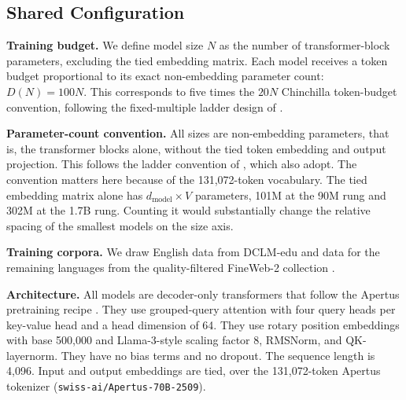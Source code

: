 \subsection{Shared Configuration}
\label{app:model-configurations}

\textbf{Training budget.}
We define model size $N$ as the number of transformer-block parameters, excluding the tied embedding matrix. Each model receives a token budget proportional to its exact non-embedding parameter count:
$D(N) = 100N.$
This corresponds to five times the $20N$ Chinchilla token-budget convention, %
following the fixed-multiple ladder design of 
\citet{magnusson_datadecide_2025}.

\textbf{Parameter-count convention.} All sizes are non-embedding parameters, that is, the transformer blocks alone, without the tied token embedding and output projection. This follows the ladder convention of \citet{bhagia_establishing_2025}, which \citet{heineman_signal_2025} also adopt. The convention matters here because of the 131,072-token vocabulary. The tied embedding matrix alone has $d_{\mathrm{model}} \times V$ parameters, 101M at the 90M rung and 302M at the 1.7B rung. Counting it would substantially change the relative spacing of the smallest models on the size axis.

\textbf{Training corpora.}
We draw English data from DCLM-edu \citep{li_datacomp-lm_2025} and data for the remaining languages from the quality-filtered FineWeb-2 collection \citep{penedo_fineweb2_2025,messmer_enhancing_2026}. %

\textbf{Architecture.} All models are decoder-only transformers that follow the Apertus pretraining recipe \citep{apertus_apertus_2025}. They use grouped-query attention \citep{ainslie_gqa_2023} with four query heads per key-value head and a head dimension of 64. They use rotary position embeddings \citep{su_roformer_2023} with base 500,000 and Llama-3-style scaling factor 8, RMSNorm, and QK-layernorm. They have no bias terms and no dropout. The sequence length is 4,096. Input and output embeddings are tied, over the 131,072-token Apertus tokenizer (\texttt{swiss-ai/Apertus-70B-2509}).

